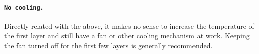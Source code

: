 \paragraph{\texttt{No cooling.}} %
\label{par:no_cooling}
Directly related with the above, it makes no sense to increase the temperature of the first layer and still have a fan or other cooling mechanism at work.  Keeping the fan turned off for the first few layers is generally recommended.
